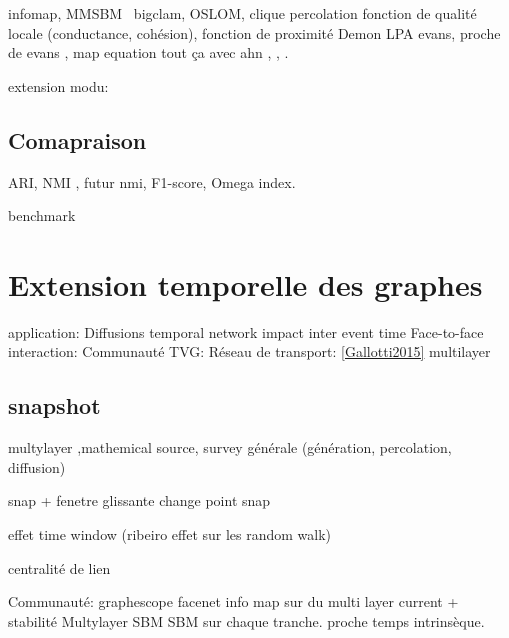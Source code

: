 infomap\cite{Esquivel2011},  MMSBM~\cite{Ball2011,Airoldi2008,Gopalan2013a} \cite{Yang2013} bigclam, OSLOM\cite{Lancichinetti2011a}, clique percolation\cite{Palla2005} fonction de qualité locale (conductance, cohésion), fonction de proximité
Demon \cite{Coscia2012c} LPA
\cite{Evans2009} evans, proche de evans \cite{Wang}, map equation\cite{Kim2011} tout ça avec ahn \cite{Ahn2010a} \cite{He2014}, \cite{Huang2013} \cite{Kim2014a} \cite{Lim2014} \cite{Shi2013}, \cite{Yu2013}.

extension modu: \cite{Shen2009,Nicosia2009}

\subsection{Comapraison}
ARI, NMI \cite{Danon2005}, futur nmi\cite{Zhang2015}, F1-score, Omega index. \cite{Porumbel2011}



benchmark \cite{Lancichinetti2008,Lancichinetti2009b}

\section{Extension temporelle des graphes}
\label{sec:intro_extension_temporelle}

\cite{Hartmann2014}

application:
Diffusions \cite{Backlund2014, Gauvin2015} \cite{Karimi2013,Holme2014a,Horvath2014,Karsai2011,Kivela2012,Lambiotte2013,Lee2012,Perotti2014,Rocha2011,Scholtes2014,Scholtes2013}temporal network \cite{Jo2014} impact inter event time
Face-to-face interaction: \cite{Barrat2013,Asur2009}
Communauté TVG: \cite{Bassett2013,Bazzi2016}
Réseau de transport: \ref{Gallotti2015} multilayer
\subsection{snapshot}
multylayer \cite{Mucha2010,Kivela2014,Peixoto2015c},mathemical source\cite{DeDomenico2013}, survey générale (génération, percolation, diffusion) \cite{Boccaletti2014}

snap\cite{Asur2009,Bassett2013,Bazzi2014} + fenetre glissante
\cite{de2016detection,Rosvall2010} change point snap

effet time window \cite{Krings2012,Ribeiro2013} (ribeiro effet sur les random walk)

centralité de lien \cite{Takaguchi2012}

Communauté:
\cite{Sun2007} graphescope
\cite{Lin2008} facenet
\cite{DeDomenico2014} info map sur du multi layer
\cite{Chakrabarti2006,Chen2013} current + stabilité
Multylayer SBM\cite{Stanley2015} \cite{Corneli2016} SBM sur chaque tranche. proche\cite{Matias2015}
\cite{Gauvin2014}
\cite{Guo2014}
\cite{Hopcroft2004}
\cite{Kalavathi2015}
temps intrinsèque.
\cite{Albano2014}

